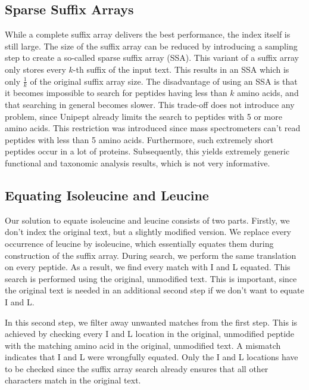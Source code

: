 \documentclass[11pt]{article}
\begin{document}
\begin{multicols}{2}
        \subsection{Sparse Suffix Arrays}
        While a complete suffix array delivers the best performance, the index itself is still large.
        The size of the suffix array can be reduced by introducing a sampling step to create a so-called sparse suffix array (SSA).
        This variant of a suffix array only stores every $k$-th suffix of the input text.
        This results in an SSA which is only $\frac{1}{k}$ of the original suffix array size.
        The disadvantage of using an SSA is that it becomes impossible to search for peptides having less than $k$ amino acids, and that searching in general becomes slower.
        This trade-off does not introduce any problem, since Unipept already limits the search to peptides with 5 or more amino acids.
        This restriction was introduced since mass spectrometers can't read peptides with less than 5 amino acids.
        Furthermore, such extremely short peptides occur in a lot of proteins.
        Subsequently, this yields extremely generic functional and taxonomic analysis results, which is not very informative.

        \subsection{Equating Isoleucine and Leucine}
        Our solution to equate isoleucine and leucine consists of two parts.
        Firstly, we don't index the original text, but a slightly modified version.
        We replace every occurrence of leucine by isoleucine, which essentially equates them during construction of the suffix array.
        During search, we perform the same translation on every peptide.
        As a result, we find every match with I and L equated.
        This search is performed using the original, unmodified text.
        This is important, since the original text is needed in an additional second step if we don't want to equate I and L\@.

        In this second step, we filter away unwanted matches from the first step.
        This is achieved by checking every I and L location in the original, unmodified peptide with the matching amino acid in the original, unmodified text.
        A mismatch indicates that I and L were wrongfully equated.
        Only the I and L locations have to be checked since the suffix array search already ensures that all other characters match in the original text.


\end{multicols}
\end{document}

